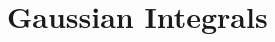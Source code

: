 \documentclass[11pt]{report}
\begin{document}
\chapter{Gaussian Integrals}
\label{chap:lec0}

\end{document}

